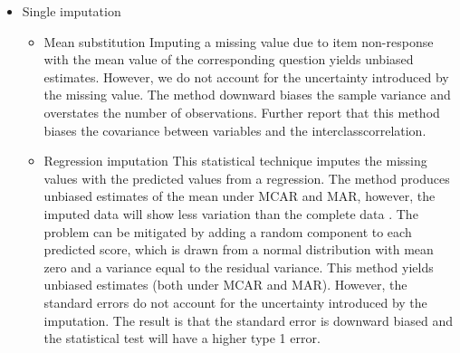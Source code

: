  \begin{itemize} 
\item Single imputation
\begin{itemize}
\item Mean substitution
Imputing a missing value due to item non-response with the mean value of the corresponding question yields unbiased estimates. However, we do not account for the uncertainty introduced by the missing value. The method downward biases the sample variance and overstates the number of observations. Further \cite{schafer2002missing} report that this method biases the covariance between variables and the interclasscorrelation. 
\item  Regression imputation
This statistical technique imputes the missing values with the predicted values from a regression. The method produces unbiased estimates of the mean under MCAR and MAR, however, the imputed data will show less variation than the complete data \cite{baraldi2010introduction}. The problem can be mitigated by adding a random component to each predicted score, which is drawn from a normal distribution with mean zero and a variance equal to the residual variance. This method yields unbiased estimates (both under MCAR and MAR). However, the standard errors do not account for the uncertainty introduced by the imputation. The result is that the standard error is downward biased and the statistical test will have a higher type 1 error.
\end{itemize}  
\end{itemize}  
